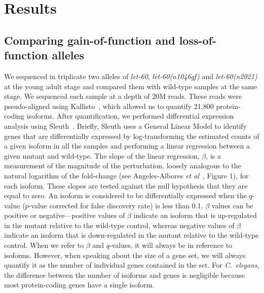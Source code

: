 \documentclass[10pt, onecolumn]{article}
\newcommand{\cel}{\emph{C.~elegans}}
\newcommand{\gene}[1]{\mbox{\emph{#1}}}
\begin{document}
\section*{Results}
\subsection*{Comparing gain-of-function and loss-of-function alleles}
We sequenced in triplicate two alleles of
\gene{let-60}, \gene{let-60(n1046gf)} and \gene{let-60(n2021)} at the young
adult stage and compared them with wild-type samples at the same stage. We
sequenced each sample at a depth of 20M reads. These reads were pseudo-aligned
using Kallisto~\cite{Bray2016}, which allowed us to quantify 21,800
protein-coding isoforms. After quantification, we performed differential
expression analysis using Sleuth~\cite{Pimentel2016a}. Briefly, Sleuth uses a
General Linear Model to identify genes that are differentially expressed by
log-transforming the estimated counts of a given isoform in all the samples and
performing a linear regression between a given mutant and wild-type. The slope
of the linear regression, $\beta$, is a measurement of the magnitude of the
perturbation, loosely analogous to the natural logarithm of the fold-change (see
Angeles-Albores \emph{et al}~\cite{}, Figure 1), for each isoform. These slopes
are tested against the null hypothesis that they are equal to zero. An isoform
is considered to be differentially expressed when the $q$-value ($p$-value
corrected for false discovery rate) is less than 0.1. $\beta$ values can be
positive or negative---positive values of $\beta$ indicate an isoform that is
up-regulated in the mutant relative to the wild-type control, whereas negative
values of $\beta$ indicate an isoform that is down-regulated in the mutant
relative to the wild-type control. When we refer to $\beta$ and $q$-values, it
will always be in reference to isoforms. However, when speaking about the size
of a gene set, we will always quantify it as the number of individual genes
contained in the set. For \cel{}, the difference between the number of isoforms
and genes is negligible because most protein-coding genes have a single isoform.
\end{document}
